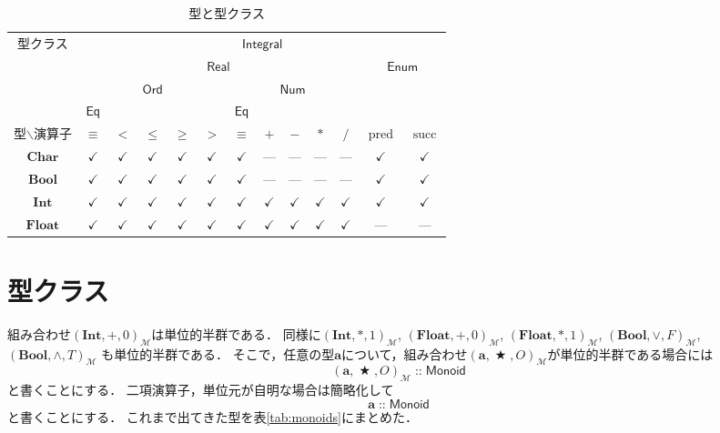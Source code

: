 \documentclass[twocolumn]{jsbook}
\newcommand{\hsklType}[1]{\textbf{#1}}
\newcommand{\hsklTypeclass}[1]{\mathsf{#1}}
\DeclareMathOperator{\hsklPred}{pred}
\DeclareMathOperator{\hsklSucc}{succ}
\newcommand{\hsklBool}{\hsklType{Bool}}
\newcommand{\hsklChar}{\hsklType{Char}}
\newcommand{\hsklEnum}{\hsklTypeclass{Enum}}
\newcommand{\hsklInt}{\hsklType{Int}}
\newcommand{\hsklIntegral}{\hsklTypeclass{Integral}}
\newcommand{\hsklEq}{\hsklTypeclass{Eq}}
\newcommand{\hsklFloat}{\hsklType{Float}}
\newcommand{\hsklMonoid}{\hsklTypeclass{Monoid}}
\newcommand{\hsklNum}{\hsklTypeclass{Num}}
\newcommand{\hsklOrd}{\hsklTypeclass{Ord}}
\newcommand{\hsklReal}{\hsklTypeclass{Real}}
\DeclareMathOperator{\mathAnyBinaryOperator}{\bigstar}
\DeclareMathOperator{\mathIn}{::}
\newcommand{\mathMonoid}[3]{(#1,#2,#3)_\mathcal{M}}
\begin{document}
\begin{table*}
\caption{型と型クラス}
\label{tab:type-and-typeclass}
\begin{center}
\begin{tabular}{||c||c|c|c|c|c|c|c|c|c|c|c|c||}
\hline
\multirow{4}{*}{型クラス}
    &\multicolumn{12}{|c||}{$\hsklIntegral$}\\
\cline{2-13}
\multirow{3}{*}{}
    &\multicolumn{10}{|c|}{$\hsklReal$}
    &\multicolumn{2}{|c||}{$\hsklEnum$}\\
\cline{2-11}
\multirow{2}{*}{}
    &\multicolumn{5}{|c|}{$\hsklOrd$}
    &\multicolumn{5}{|c|}{$\hsklNum$}
    &\multicolumn{2}{|c||}{ }\\
\cline{2-2}\cline{7-7}
{ }
    &$\hsklEq$
    &\multicolumn{4}{|c|}{ }
    &$\hsklEq$
    &\multicolumn{4}{|c|}{ }
    &\multicolumn{2}{|c||}{ }\\
\hline\hline
型$\backslash$演算子
    &$\equiv$
    &$<$
    &$\le$
    &$\ge$
    &$>$
    &$\equiv$
    &$+$
    &$-$
    &$*$
    &$/$
    &$\hsklPred$
    &$\hsklSucc$\\
\hline
$\hsklChar$
    &$\checkmark$
    &$\checkmark$
    &$\checkmark$
    &$\checkmark$
    &$\checkmark$
    &$\checkmark$
    &---
    &---
    &---
    &---
    &$\checkmark$
    &$\checkmark$\\
\hline
$\hsklBool$
    &$\checkmark$
    &$\checkmark$
    &$\checkmark$
    &$\checkmark$
    &$\checkmark$
    &$\checkmark$
    &---
    &---
    &---
    &---
    &$\checkmark$
    &$\checkmark$\\
\hline
$\hsklInt$
    &$\checkmark$
    &$\checkmark$
    &$\checkmark$
    &$\checkmark$
    &$\checkmark$
    &$\checkmark$
    &$\checkmark$
    &$\checkmark$
    &$\checkmark$
    &$\checkmark$
    &$\checkmark$
    &$\checkmark$\\
\hline
$\hsklFloat$
    &$\checkmark$
    &$\checkmark$
    &$\checkmark$
    &$\checkmark$
    &$\checkmark$
    &$\checkmark$
    &$\checkmark$
    &$\checkmark$
    &$\checkmark$
    &$\checkmark$
    &---
    &---\\
\hline
\end{tabular}
\end{center}
\end{table*}

\section{型クラス}

組み合わせ$\mathMonoid{\hsklInt}{+}{0}$は単位的半群である．
同様に$\mathMonoid{\hsklInt}{*}{1}$, $\mathMonoid{\hsklFloat}{+}{0}$, $\mathMonoid{\hsklFloat}{*}{1}$, $\mathMonoid{\hsklBool}{\vee}{F}$, $\mathMonoid{\hsklBool}{\wedge}{T}$ も単位的半群である．
そこで，任意の型$\hsklType{a}$について，組み合わせ$\mathMonoid{\hsklType{a}}{\mathAnyBinaryOperator}{O}$が単位的半群である場合には$$\mathMonoid{\hsklType{a}}{\mathAnyBinaryOperator}{O}\mathIn\hsklMonoid$$と書くことにする．
二項演算子，単位元が自明な場合は簡略化して$$\hsklType{a}\mathIn\hsklMonoid$$と書くことにする．
これまで出てきた型を表\ref{tab:monoids}にまとめた．
\end{document}
